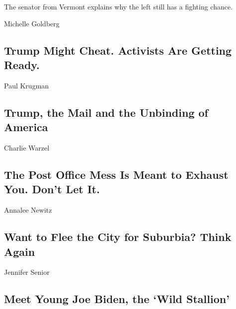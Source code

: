 The senator from Vermont explains why the left still has a fighting
chance.

\href{/2020/08/17/opinion/bernie-sanders-joe-biden.html}{}

\href{/2020/08/17/opinion/trump-contested-election-protests.html}{}

Michelle Goldberg

\hypertarget{trump-might-cheat-activists-are-getting-ready}{%
\subsection{Trump Might Cheat. Activists Are Getting
Ready.}\label{trump-might-cheat-activists-are-getting-ready}}

\href{/2020/08/17/opinion/trump-us-mail.html}{}

Paul Krugman

\hypertarget{trump-the-mail-and-the-unbinding-of-america}{%
\subsection{Trump, the Mail and the Unbinding of
America}\label{trump-the-mail-and-the-unbinding-of-america}}

\href{/2020/08/17/opinion/trump-post-office-election.html}{}

Charlie Warzel

\hypertarget{the-post-office-mess-is-meant-to-exhaust-you-dont-let-it}{%
\subsection{The Post Office Mess Is Meant to Exhaust You. Don't Let
It.}\label{the-post-office-mess-is-meant-to-exhaust-you-dont-let-it}}

\href{/2020/08/17/opinion/coronavirus-cities-suburbs.html}{}

Annalee Newitz

\hypertarget{want-to-flee-the-city-for-suburbia-think-again}{%
\subsection{Want to Flee the City for Suburbia? Think
Again}\label{want-to-flee-the-city-for-suburbia-think-again}}

\href{/2020/08/15/opinion/joe-biden-2020-1988-what-it-takes.html}{}

Jennifer Senior

\hypertarget{meet-young-joe-biden-the-wild-stallion}{%
\subsection{Meet Young Joe Biden, the `Wild
Stallion'}\label{meet-young-joe-biden-the-wild-stallion}}

